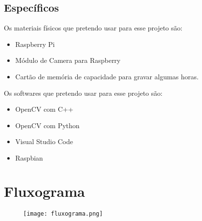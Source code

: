 \documentclass[14pt]{scrartcl} %
\begin{document}
\subsection{Específicos}
Os materiais físicos que pretendo usar para esse projeto são:
\begin{itemize}
  \item Raspberry Pi
  \item Módulo de Camera para Raspberry
  \item Cartão de memória de capacidade para gravar algumas horas.
\end{itemize}

Os softwares que pretendo usar para esse projeto são:
\begin{itemize}
  \item OpenCV com C++
  \item OpenCV com Python
  \item Visual Studio Code
  \item Raspbian
\end{itemize}

\newpage
\section{Fluxograma}
\begin{figure}[h]
	\centering
	\texttt{[image: fluxograma.png]}
\end{figure}
\end{document}
